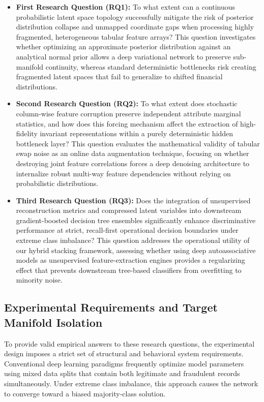 \documentclass[11pt,a4paper]{report}
\begin{document}
\begin{itemize}
    \item \textbf{First Research Question (RQ1):} To what extent can a continuous probabilistic latent space topology successfully mitigate the risk of posterior distribution collapse and unmapped coordinate gaps when processing highly fragmented, heterogeneous tabular feature arrays? This question investigates whether optimizing an approximate posterior distribution against an analytical normal prior allows a deep variational network to preserve sub-manifold continuity, whereas standard deterministic bottlenecks risk creating fragmented latent spaces that fail to generalize to shifted financial distributions.
    \item \textbf{Second Research Question (RQ2):} To what extent does stochastic column-wise feature corruption preserve independent attribute marginal statistics, and how does this forcing mechanism affect the extraction of high-fidelity invariant representations within a purely deterministic hidden bottleneck layer? This question evaluates the mathematical validity of tabular swap noise as an online data augmentation technique, focusing on whether destroying joint feature correlations forces a deep denoising architecture to internalize robust multi-way feature dependencies without relying on probabilistic distributions.
    \item \textbf{Third Research Question (RQ3):} Does the integration of unsupervised reconstruction metrics and compressed latent variables into downstream gradient-boosted decision tree ensembles significantly enhance discriminative performance at strict, recall-first operational decision boundaries under extreme class imbalance? This question addresses the operational utility of our hybrid stacking framework, assessing whether using deep autoassociative models as unsupervised feature-extraction engines provides a regularizing effect that prevents downstream tree-based classifiers from overfitting to minority noise.
\end{itemize}

\subsection{Experimental Requirements and Target Manifold Isolation}
To provide valid empirical answers to these research questions, the experimental design imposes a strict set of structural and behavioral system requirements. Conventional deep learning paradigms frequently optimize model parameters using mixed data splits that contain both legitimate and fraudulent records simultaneously. Under extreme class imbalance, this approach causes the network to converge toward a biased majority-class solution. 
\end{document}
